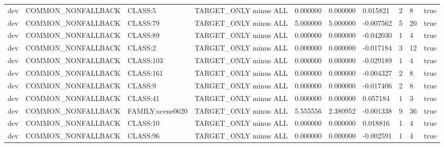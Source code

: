 \begin{tabular}{llllllllll}
dev & COMMON\_NONFALLBACK & CLASS:5 & TARGET\_ONLY minus ALL & 0.000000 & 0.000000 & 0.015821 & 2 & 8 & true \\
dev & COMMON\_NONFALLBACK & CLASS:79 & TARGET\_ONLY minus ALL & 5.000000 & 5.000000 & -0.007562 & 5 & 20 & true \\
dev & COMMON\_NONFALLBACK & CLASS:89 & TARGET\_ONLY minus ALL & 0.000000 & 0.000000 & -0.042030 & 1 & 4 & true \\
dev & COMMON\_NONFALLBACK & CLASS:2 & TARGET\_ONLY minus ALL & 0.000000 & 0.000000 & -0.017184 & 3 & 12 & true \\
dev & COMMON\_NONFALLBACK & CLASS:103 & TARGET\_ONLY minus ALL & 0.000000 & 0.000000 & -0.029189 & 1 & 4 & true \\
dev & COMMON\_NONFALLBACK & CLASS:161 & TARGET\_ONLY minus ALL & 0.000000 & 0.000000 & -0.004327 & 2 & 8 & true \\
dev & COMMON\_NONFALLBACK & CLASS:9 & TARGET\_ONLY minus ALL & 0.000000 & 0.000000 & -0.017406 & 2 & 8 & true \\
dev & COMMON\_NONFALLBACK & CLASS:41 & TARGET\_ONLY minus ALL & 0.000000 & 0.000000 & 0.057184 & 1 & 3 & true \\
dev & COMMON\_NONFALLBACK & FAMILY:scene0620 & TARGET\_ONLY minus ALL & 5.555556 & 2.380952 & -0.001338 & 9 & 36 & true \\
dev & COMMON\_NONFALLBACK & CLASS:10 & TARGET\_ONLY minus ALL & 0.000000 & 0.000000 & 0.018816 & 1 & 4 & true \\
dev & COMMON\_NONFALLBACK & CLASS:96 & TARGET\_ONLY minus ALL & 0.000000 & 0.000000 & -0.002591 & 1 & 4 & true \\
\bottomrule
\end{tabular}
